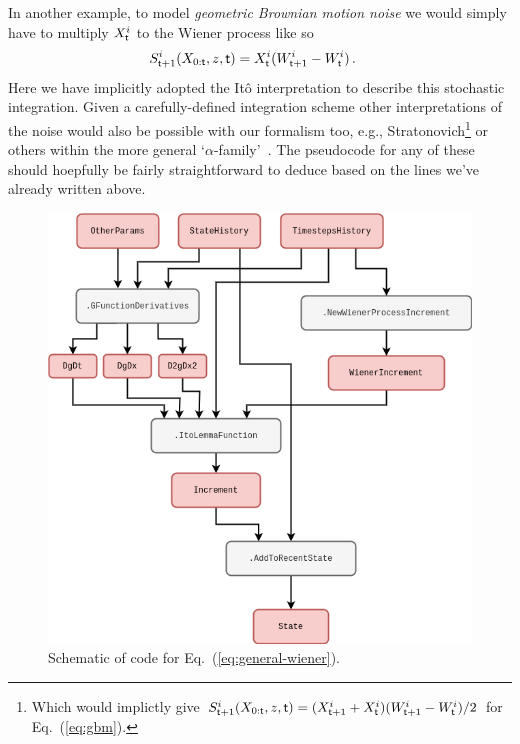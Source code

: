 In another example, to model \emph{geometric Brownian motion noise} we would simply have to multiply $X^i_{\sf t}$ to the Wiener process like so
\begin{align}
& S^{i}_{{\sf t}+1}(X_{0:{\sf t}},z,{\sf t}) = X^i_{\sf t}(W^i_{{\sf t}+1}-W^i_{\sf t})\label{eq:gbm} \,.
\end{align}
Here we have implicitly adopted the Itô interpretation to describe this stochastic integration. Given a carefully-defined integration scheme other interpretations of the noise would also be possible with our formalism too, e.g., Stratonovich\footnote{Which would implictly give $S^{i}_{{\sf t}+1}(X_{0:{\sf t}},z,{\sf t}) = (X^i_{{\sf t}+1}+X^i_{\sf t})(W^i_{{\sf t}+1}-W^i_{\sf t}) / 2$ for Eq.~(\ref{eq:gbm}).} or others within the more general `$\alpha$-family'~\cite{van1992stochastic,risken1996fokker,rog-will-2000}. The pseudocode for any of these should hoepfully be fairly straightforward to deduce based on the lines we've already written above.

\begin{figure}[h]
\centering
\includegraphics[width=12cm]{images/chapter-1-ito-lemma.drawio.png}
\caption{Schematic of code for Eq.~(\ref{eq:general-wiener}).}
\label{fig:ito-lemma}
\end{figure}

